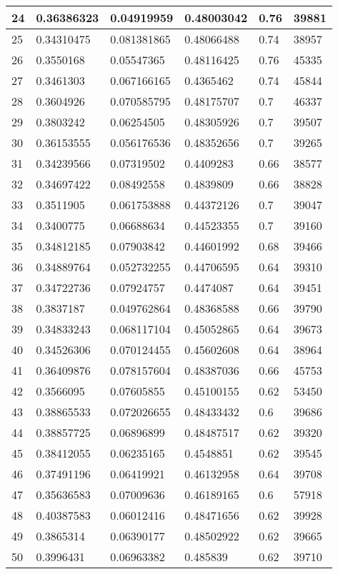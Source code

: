 \begin{longtable}{|l|l|l|l|l|l|}
24 & 0.36386323 & 0.04919959 & 0.48003042 & 0.76 & 39881 \\ \hline 
25 & 0.34310475 & 0.081381865 & 0.48066488 & 0.74 & 38957 \\ \hline 
26 & 0.3550168 & 0.05547365 & 0.48116425 & 0.76 & 45335 \\ \hline 
27 & 0.3461303 & 0.067166165 & 0.4365462 & 0.74 & 45844 \\ \hline 
28 & 0.3604926 & 0.070585795 & 0.48175707 & 0.7 & 46337 \\ \hline 
29 & 0.3803242 & 0.06254505 & 0.48305926 & 0.7 & 39507 \\ \hline 
30 & 0.36153555 & 0.056176536 & 0.48352656 & 0.7 & 39265 \\ \hline 
31 & 0.34239566 & 0.07319502 & 0.4409283 & 0.66 & 38577 \\ \hline 
32 & 0.34697422 & 0.08492558 & 0.4839809 & 0.66 & 38828 \\ \hline 
33 & 0.3511905 & 0.061753888 & 0.44372126 & 0.7 & 39047 \\ \hline 
34 & 0.3400775 & 0.06688634 & 0.44523355 & 0.7 & 39160 \\ \hline 
35 & 0.34812185 & 0.07903842 & 0.44601992 & 0.68 & 39466 \\ \hline 
36 & 0.34889764 & 0.052732255 & 0.44706595 & 0.64 & 39310 \\ \hline 
37 & 0.34722736 & 0.07924757 & 0.4474087 & 0.64 & 39451 \\ \hline 
38 & 0.3837187 & 0.049762864 & 0.48368588 & 0.66 & 39790 \\ \hline 
39 & 0.34833243 & 0.068117104 & 0.45052865 & 0.64 & 39673 \\ \hline 
40 & 0.34526306 & 0.070124455 & 0.45602608 & 0.64 & 38964 \\ \hline 
41 & 0.36409876 & 0.078157604 & 0.48387036 & 0.66 & 45753 \\ \hline 
42 & 0.3566095 & 0.07605855 & 0.45100155 & 0.62 & 53450 \\ \hline 
43 & 0.38865533 & 0.072026655 & 0.48433432 & 0.6 & 39686 \\ \hline 
44 & 0.38857725 & 0.06896899 & 0.48487517 & 0.62 & 39320 \\ \hline 
45 & 0.38412055 & 0.06235165 & 0.4548851 & 0.62 & 39545 \\ \hline 
46 & 0.37491196 & 0.06419921 & 0.46132958 & 0.64 & 39708 \\ \hline 
47 & 0.35636583 & 0.07009636 & 0.46189165 & 0.6 & 57918 \\ \hline 
48 & 0.40387583 & 0.06012416 & 0.48471656 & 0.62 & 39928 \\ \hline 
49 & 0.3865314 & 0.06390177 & 0.48502922 & 0.62 & 39665 \\ \hline 
50 & 0.3996431 & 0.06963382 & 0.485839 & 0.62 & 39710 \\ \hline 
\end{longtable}